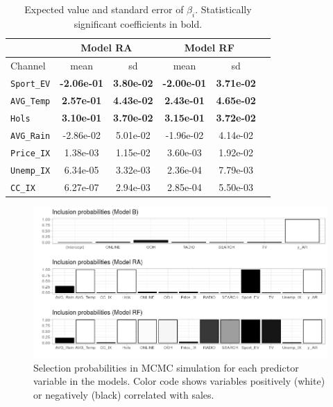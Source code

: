 \begin{table}[h]
\centering
\begin{tabular}{ |l|c|c|c|c|c| }
  \hline
  &  \multicolumn{2}{|c|}{Model RA} & \multicolumn{2}{|c|}{Model RF}\\
  \hline
  Channel & mean & sd & mean & sd\\
  \hline
  \texttt{Sport\_EV} & \textbf{-2.06e-01} & \textbf{3.80e-02} & \textbf{-2.00e-01} &\textbf{ 3.71e-02} \\
  \texttt{AVG\_Temp} &  \textbf{2.57e-01} & \textbf{4.43e-02} & \textbf{2.43e-01} & \textbf{4.65e-02}   \\
  \texttt{Hols} & \textbf{3.10e-01} &\textbf{ 3.70e-02}   & \textbf{3.15e-01} & \textbf{3.72e-02}  \\
  \texttt{AVG\_Rain} &  -2.86e-02 & 5.01e-02 & -1.96e-02 & 4.14e-02     \\
  \texttt{Price\_IX} &  1.38e-03 &  1.15e-02 & 3.60e-03 & 1.92e-02  \\
  \texttt{Unemp\_IX} &  6.34e-05 & 3.32e-03 & 2.36e-04 & 7.79e-03  \\
  \texttt{CC\_IX} & 6.27e-07 & 2.94e-03 & 2.85e-04 & 5.50e-03 \\
    \hline
\end{tabular} \caption{Expected value and standard error of  $\beta_i$. Statistically significant coefficients in  bold.}\label{tab:11}
\end{table}



\begin{figure}[h]
\centering
\includegraphics[scale=0.6]{figures/inc_probas2.png}
\caption{Selection probabilities in  MCMC simulation for each predictor variable in the  models. Color code shows variables positively (white) or negatively (black) correlated with sales. }\label{fig:inc_probas}
\end{figure}

